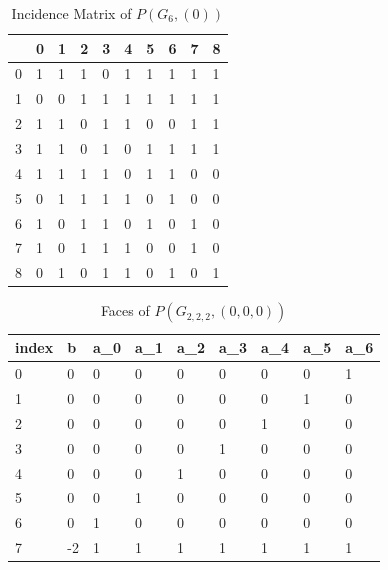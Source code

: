 \documentclass{article}
\begin{document}
\begin{table}[]
	\centering
	\caption{Incidence Matrix of $P(G_6, (0))$}
	\label{G6Inc}
	\begin{tabular}{@{}llllllllll@{}}
		\toprule
		& 0 & 1 & 2 & 3 & 4 & 5 & 6 & 7 & 8 \\ \midrule
		0 & 1 & 1 & 1 & 0 & 1 & 1 & 1 & 1 & 1 \\
		1 & 0 & 0 & 1 & 1 & 1 & 1 & 1 & 1 & 1 \\
		2 & 1 & 1 & 0 & 1 & 1 & 0 & 0 & 1 & 1 \\
		3 & 1 & 1 & 0 & 1 & 0 & 1 & 1 & 1 & 1 \\
		4 & 1 & 1 & 1 & 1 & 0 & 1 & 1 & 0 & 0 \\
		5 & 0 & 1 & 1 & 1 & 1 & 0 & 1 & 0 & 0 \\
		6 & 1 & 0 & 1 & 1 & 0 & 1 & 0 & 1 & 0 \\
		7 & 1 & 0 & 1 & 1 & 1 & 0 & 0 & 1 & 0 \\
		8 & 0 & 1 & 0 & 1 & 1 & 0 & 1 & 0 & 1 \\ \bottomrule
	\end{tabular}
\end{table}

\begin{table}[H]
	\centering
	\caption{Faces of $P(G_{2,2,2}, (0,0,0))$}
	\label{G222Faces}
	\begin{tabular}{@{}lllllllll@{}}
		\toprule
		index & b  & a\_0 & a\_1 & a\_2 & a\_3 & a\_4 & a\_5 & a\_6 \\ \midrule
		0     & 0  & 0    & 0    & 0    & 0    & 0    & 0    & 1    \\
		1     & 0  & 0    & 0    & 0    & 0    & 0    & 1    & 0    \\
		2     & 0  & 0    & 0    & 0    & 0    & 1    & 0    & 0    \\
		3     & 0  & 0    & 0    & 0    & 1    & 0    & 0    & 0    \\
		4     & 0  & 0    & 0    & 1    & 0    & 0    & 0    & 0    \\
		5     & 0  & 0    & 1    & 0    & 0    & 0    & 0    & 0    \\
		6     & 0  & 1    & 0    & 0    & 0    & 0    & 0    & 0    \\
		7     & -2 & 1    & 1    & 1    & 1    & 1    & 1    & 1    \\ \bottomrule
	\end{tabular}
\end{table}
\end{document}

